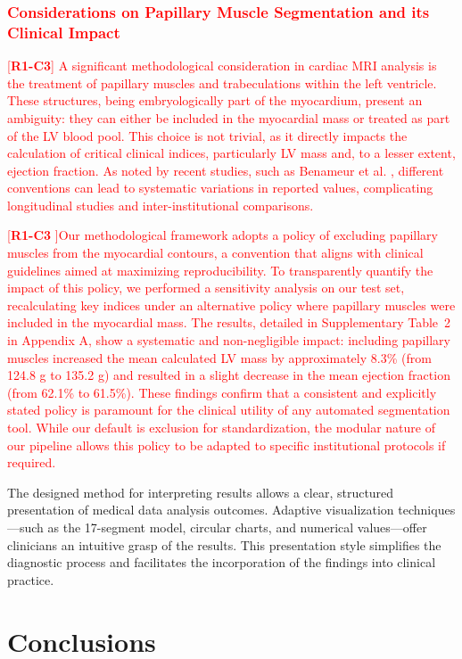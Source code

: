 \documentclass[fleqn,10pt]{wlscirep}
\newcommand{\revtag}[2]{[\textbf{R#1-C#2}]}
\newcommand{\Rone}[1]{\textcolor{red}{#1}}
\begin{document}
\Rone{\subsubsection*{Considerations on Papillary Muscle Segmentation and its Clinical Impact}}
\Rone{\revtag{1}{3} A significant methodological consideration in cardiac MRI analysis is the treatment of papillary muscles and trabeculations within the left ventricle. These structures, being embryologically part of the myocardium, present an ambiguity: they can either be included in the myocardial mass or treated as part of the LV blood pool. This choice is not trivial, as it directly impacts the calculation of critical clinical indices, particularly LV mass and, to a lesser extent, ejection fraction. As noted by recent studies, such as Benameur et al. \cite{Benameur:2025}, different conventions can lead to systematic variations in reported values, complicating longitudinal studies and inter-institutional comparisons.}

\Rone{\revtag{1}{3 }Our methodological framework adopts a policy of excluding papillary muscles from the myocardial contours, a convention that aligns with clinical guidelines aimed at maximizing reproducibility. To transparently quantify the impact of this policy, we performed a sensitivity analysis on our test set, recalculating key indices under an alternative policy where papillary muscles were included in the myocardial mass. The results, detailed in Supplementary Table~2 in Appendix A, show a systematic and non-negligible impact: including papillary muscles increased the mean calculated LV mass by approximately 8.3\% (from 124.8 g to 135.2 g) and resulted in a slight decrease in the mean ejection fraction (from 62.1\% to 61.5\%). These findings confirm that a consistent and explicitly stated policy is paramount for the clinical utility of any automated segmentation tool. While our default is exclusion for standardization, the modular nature of our pipeline allows this policy to be adapted to specific institutional protocols if required.}

The designed method for interpreting results allows a clear, structured presentation of medical data analysis outcomes. Adaptive visualization techniques---such as the 17-segment model, circular charts, and numerical values---offer clinicians an intuitive grasp of the results. This presentation style simplifies the diagnostic process and facilitates the incorporation of the findings into clinical practice.

\section*{Conclusions}
\end{document}
